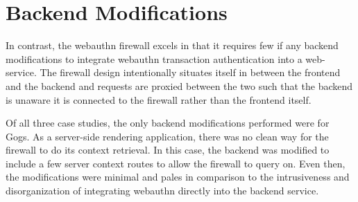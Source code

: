 








\section{Backend Modifications}

In contrast, the webauthn firewall excels in that it requires few if any backend modifications to integrate webauthn transaction authentication into a web-service. The firewall design intentionally situates itself in between the frontend and the backend and requests are proxied between the two such that the backend is unaware it is connected to the firewall rather than the frontend itself.

Of all three case studies, the only backend modifications performed were for Gogs. As a server-side rendering application, there was no clean way for the firewall to do its context retrieval. In this case, the backend was modified to include a few server context routes to allow the firewall to query on. Even then, the modifications were minimal and pales in comparison to the intrusiveness and disorganization of integrating webauthn directly into the backend service.






